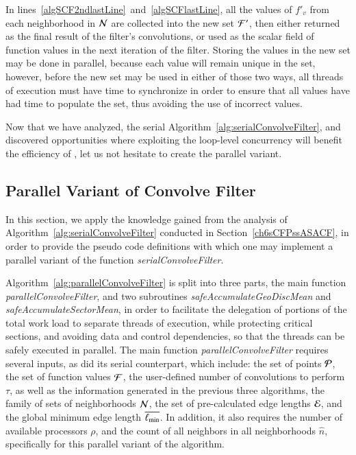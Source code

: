 In lines~\ref{algSCF2ndlastLine}~and~\ref{algSCFlastLine}, all the values of $f'_v$ from each neighborhood in $\mathcal{N}$ are collected into the new set $\mathcal{F}'$, then either returned as the final result of the filter's convolutions, or used as the scalar field of function values in the next iteration of the filter. Storing the values in the new set may be done in parallel, because each value will remain unique in the set, however, before the new set may be used in either of those two ways, all threads of execution must have time to synchronize in order to ensure that all values have had time to populate the set, thus avoiding the use of incorrect values.

Now that we have analyzed, the serial Algorithm~\ref{alg:serialConvolveFilter}, and discovered opportunities where exploiting the loop-level concurrency will benefit the efficiency of , let us not hesitate to create the parallel variant.

%
%
\subsection{Parallel Variant of Convolve Filter}
\label{ch6sCFPssPRCN}
In this section, we apply the knowledge gained from the analysis of Algorithm~\ref{alg:serialConvolveFilter} conducted in Section~\ref{ch6sCFPssASACF}, in order to provide the pseudo code definitions with which one may implement a parallel variant of the function \textit{serialConvolveFilter}.

Algorithm~\ref{alg:parallelConvolveFilter} is split into three parts, the main function \textit{parallelConvolveFilter}, and two subroutines \textit{safeAccumulateGeoDiscMean} and \textit{safeAccumulateSectorMean}, in order to facilitate the delegation of portions of the total work load to separate threads of execution, while protecting critical sections, and avoiding data and control dependencies, so that the threads can be safely executed in parallel. The main function \textit{parallelConvolveFilter} requires several inputs, as did its serial counterpart, which include: the set of points $\mathcal{P}$, the set of function values $\mathcal{F}$, the user-defined number of convolutions to perform $\tau$, as well as the information generated in the previous three algorithms, the family of sets of neighborhoods $\mathcal{N}$, the set of pre-calculated edge lengths $\mathcal{E}$, and the global minimum edge length $\overline{\ell_\text{min}}$. In addition, it also requires the number of available processors $\rho$, and the count of all neighbors in all neighborhoods $\hat{n}$, specifically for this parallel variant of the algorithm.

